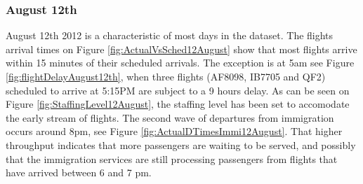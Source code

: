 \documentclass[11pt,onecolumn]{IEEEtran}
\begin{document}
\subsubsection{August 12th}
August 12th 2012 is a characteristic of most days in the dataset. The flights arrival times on Figure \ref{fig:ActualVsSched12August} show that most flights arrive within 15 minutes of their scheduled arrivals. 
The exception is at 5am see Figure \ref{fig:flightDelayAugust12th}, when three flights (AF8098, IB7705 and QF2) scheduled to arrive at 5:15PM are subject to a 9 hours delay.
As can be seen on Figure \ref{fig:StaffingLevel12August}, the staffing level has been set to accomodate the early stream of flights.
The second wave of departures from immigration occurs around 8pm, see Figure \ref{fig:ActualDTimesImmi12August}. That higher throughput indicates that more passengers are waiting to be served, and possibly that the immigration services are still processing passengers from flights that have arrived between 6 and 7 pm.\\
\end{document}
